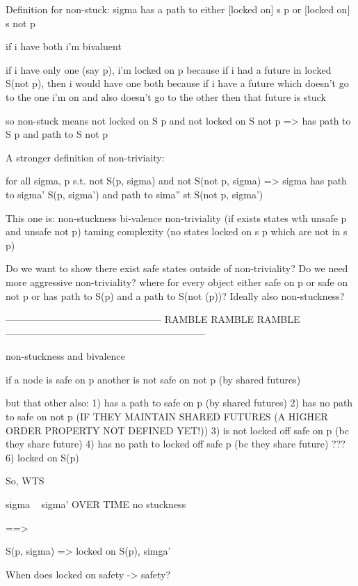 \documentclass{article}
\theoremstyle{definition}
\begin{document}
\iffalse

Definition for non-stuck: sigma has a path to either [locked on] s p or [locked on] s not p

if i have both i'm bivaluent

if i have only one (say p), i'm locked on p
  because if i had a future in locked S(not p), then i would have one both
  because if i have a future which doesn't go to the one i'm on and also doesn't go to the other
  then that future is stuck


so non-stuck means not locked on S p and not locked on S not p => has path to S p and path to S not p



A stronger definition of non-triviaity:

for all sigma, p s.t. not S(p, sigma) and not S(not p, sigma) => sigma has path to sigma' S(p, sigma') and path to sima'' st S(not p, sigma')

This one is:
  non-stuckness
  bi-valence
  non-triviality (if exists states wth unsafe p and unsafe not p)
  taming complexity (no states locked on s p which are not in s p)

Do we want to show there exist safe states outside of non-triviality?
Do we need more aggressive non-triviality?
where for every object either safe on p or safe on not p or has path to S(p) and a path to S(not (p))?
Ideally also non-stuckness?


------------------------------------------------ RAMBLE RAMBLE RAMBLE --------------------------------------------------------------


non-stuckness and bivalence

if a node is safe on p
another is not safe on not p (by shared futures)

but that other also:
1) has a path to safe on p (by shared futures)
2) has no path to safe on not p (IF THEY MAINTAIN SHARED FUTURES (A HIGHER ORDER PROPERTY NOT DEFINED YET!))
3) is not locked off safe on p (bc they share future)
4) has no path to locked off safe p (bc they share future)
???
6) locked on S(p)





So, WTS

sigma ~ sigma' OVER TIME
no stuckness

==>

S(p, sigma) => locked on S(p), simga'

When does locked on safety -> safety?
\end{document}
